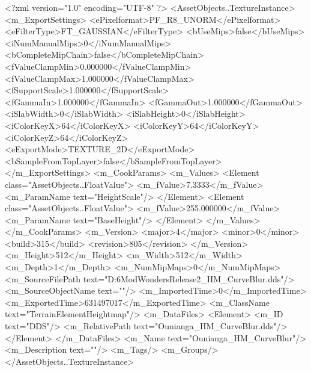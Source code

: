 <?xml version="1.0" encoding="UTF-8" ?>
<AssetObjects..TextureInstance>
	<m_ExportSettings>
		<ePixelformat>PF_R8_UNORM</ePixelformat>
		<eFilterType>FT_GAUSSIAN</eFilterType>
		<bUseMips>false</bUseMips>
		<iNumManualMips>0</iNumManualMips>
		<bCompleteMipChain>false</bCompleteMipChain>
		<fValueClampMin>0.000000</fValueClampMin>
		<fValueClampMax>1.000000</fValueClampMax>
		<fSupportScale>1.000000</fSupportScale>
		<fGammaIn>1.000000</fGammaIn>
		<fGammaOut>1.000000</fGammaOut>
		<iSlabWidth>0</iSlabWidth>
		<iSlabHeight>0</iSlabHeight>
		<iColorKeyX>64</iColorKeyX>
		<iColorKeyY>64</iColorKeyY>
		<iColorKeyZ>64</iColorKeyZ>
		<eExportMode>TEXTURE_2D</eExportMode>
		<bSampleFromTopLayer>false</bSampleFromTopLayer>
	</m_ExportSettings>
	<m_CookParams>
		<m_Values>
			<Element class="AssetObjects..FloatValue">
				<m_fValue>7.3333</m_fValue>
				<m_ParamName text="HeightScale"/>
			</Element>
			<Element class="AssetObjects..FloatValue">
				<m_fValue>255.000000</m_fValue>
				<m_ParamName text="BaseHeight"/>
			</Element>
		</m_Values>
	</m_CookParams>
	<m_Version>
		<major>4</major>
		<minor>0</minor>
		<build>315</build>
		<revision>805</revision>
	</m_Version>
	<m_Height>512</m_Height>
	<m_Width>512</m_Width>
	<m_Depth>1</m_Depth>
	<m_NumMipMaps>0</m_NumMipMaps>
	<m_SourceFilePath text="D:\Civ6Mod\Terrain\NW\Natural Wonders\TM Release2\Ounianga\Ounianga_HM_CurveBlur.dds"/>
	<m_SourceObjectName text=""/>
	<m_ImportedTime>0</m_ImportedTime>
	<m_ExportedTime>631497017</m_ExportedTime>
	<m_ClassName text="TerrainElementHeightmap"/>
	<m_DataFiles>
		<Element>
			<m_ID text="DDS"/>
			<m_RelativePath text="Ounianga_HM_CurveBlur.dds"/>
		</Element>
	</m_DataFiles>
	<m_Name text="Ounianga_HM_CurveBlur"/>
	<m_Description text=""/>
	<m_Tags/>
	<m_Groups/>
</AssetObjects..TextureInstance>

